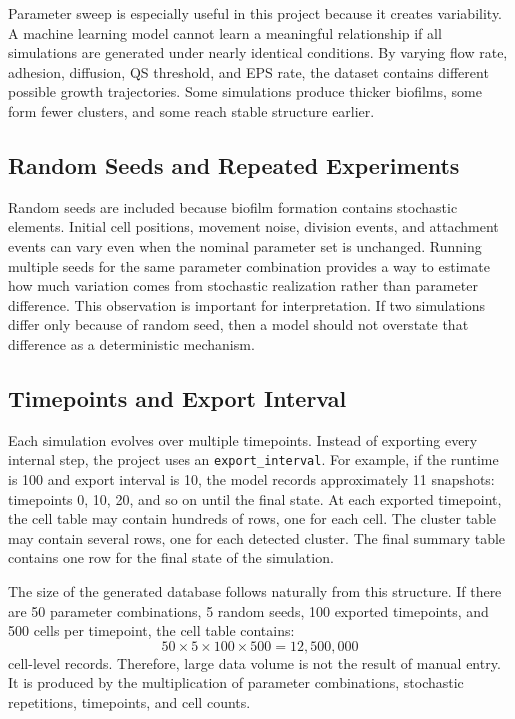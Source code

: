 \documentclass[12pt,a4paper,oneside]{report}
\begin{document}
Parameter sweep is especially useful in this project because it creates variability. A machine learning model cannot learn a meaningful relationship if all simulations are generated under nearly identical conditions. By varying flow rate, adhesion, diffusion, QS threshold, and EPS rate, the dataset contains different possible growth trajectories. Some simulations produce thicker biofilms, some form fewer clusters, and some reach stable structure earlier.

\subsection{Random Seeds and Repeated Experiments}
Random seeds are included because biofilm formation contains stochastic elements. Initial cell positions, movement noise, division events, and attachment events can vary even when the nominal parameter set is unchanged. Running multiple seeds for the same parameter combination provides a way to estimate how much variation comes from stochastic realization rather than parameter difference. This observation is important for interpretation. If two simulations differ only because of random seed, then a model should not overstate that difference as a deterministic mechanism.

\subsection{Timepoints and Export Interval}
Each simulation evolves over multiple timepoints. Instead of exporting every internal step, the project uses an \texttt{export\_interval}. For example, if the runtime is 100 and export interval is 10, the model records approximately 11 snapshots: timepoints 0, 10, 20, and so on until the final state. At each exported timepoint, the cell table may contain hundreds of rows, one for each cell. The cluster table may contain several rows, one for each detected cluster. The final summary table contains one row for the final state of the simulation.

The size of the generated database follows naturally from this structure. If there are 50 parameter combinations, 5 random seeds, 100 exported timepoints, and 500 cells per timepoint, the cell table contains:
\begin{equation}
50 \times 5 \times 100 \times 500 = 12,500,000
\end{equation}
cell-level records. Therefore, large data volume is not the result of manual entry. It is produced by the multiplication of parameter combinations, stochastic repetitions, timepoints, and cell counts.
\end{document}
